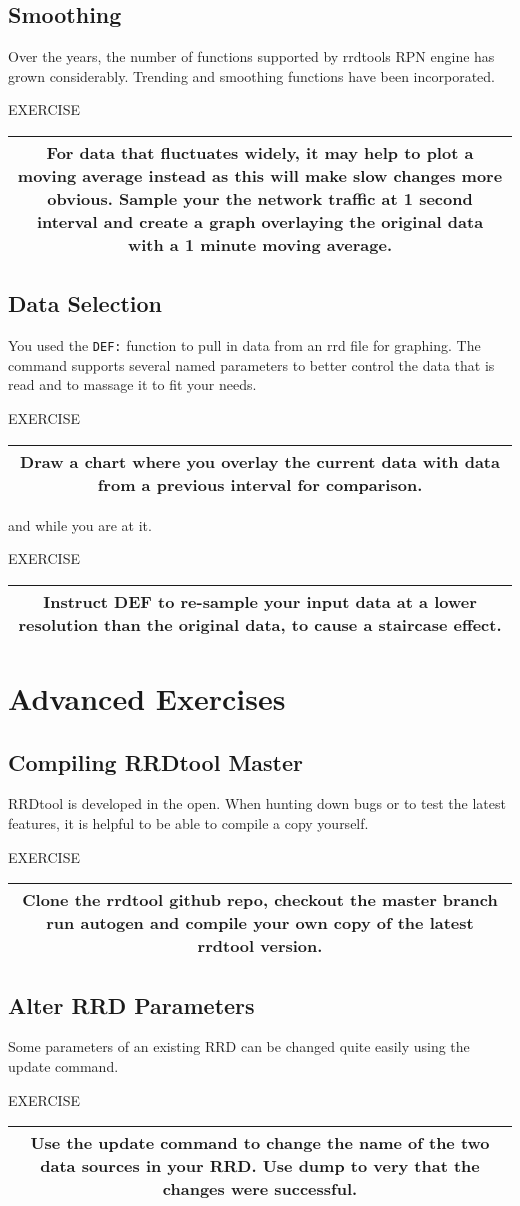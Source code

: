 \documentclass[a4paper,12pt]{article}
\newenvironment{work}{\textsf{\tiny EXERCISE}\nopagebreak\\[0.3ex]\begin{tabular}{|c|}
 \hline
 \begin{minipage}{0.965\linewidth}%
 \setlength{\parskip}{1.6ex plus 0.6ex minus 0.4ex}%
 \rule{0pt}{2.8ex}\ignorespaces}
{\rule[-1.8ex]{0pt}{0pt}\end{minipage}\\
 \hline
 \end{tabular}}
\newcommand{\ex}[1]{\subsection{#1}}
\newcommand{\cmd}[1]{\texttt{\mbox{#1}}}
\begin{document}
\ex{Smoothing}

Over the years, the number of functions supported by rrdtools RPN engine has
grown considerably. Trending and smoothing functions have been incorporated.

\begin{work}
For data that fluctuates widely, it may help to plot a moving average instead as this will make slow changes more obvious.
Sample your the network traffic at 1 second interval and create a graph overlaying the original data with a 1 minute moving average.
\end{work}

\ex{Data Selection}

You used the \cmd{DEF:} function to pull in data from an rrd file for graphing. The command supports several named parameters to better
control the data that is read and to massage it to fit your needs.

\begin{work}
Draw a chart where you overlay the current data with data from a previous interval for comparison.
\end{work}

and while you are at it.

\begin{work}
Instruct DEF to re-sample your input data at a lower resolution than the original data, to cause a staircase effect.
\end{work} 

\newpage
\section{Advanced Exercises}
\ex{Compiling RRDtool Master}

RRDtool is developed in the open. When hunting down bugs or to test the latest features, it is helpful to be able to compile a copy yourself.

\begin{work}
Clone the rrdtool github repo, checkout the master branch run autogen and compile your own copy of the latest rrdtool version.
\end{work}

\ex{Alter RRD Parameters}
Some parameters of an existing RRD can be changed quite easily using
the update command.

\begin{work}
Use the update command to change the name of the two data sources in
your RRD. Use dump to very that the changes were successful.
\end{work}
\end{document}
